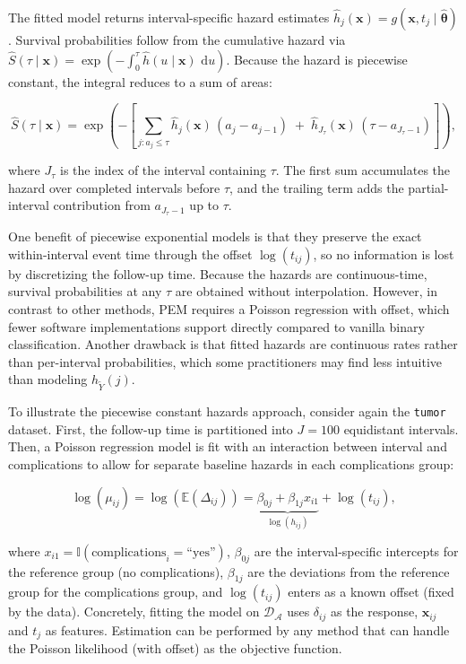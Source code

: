 \documentclass[
  letterpaper,
  krantz2]{style/krantz}
\begin{document}
The fitted model returns interval-specific hazard estimates
\(\hat{h}_j(\mathbf{x}) = g(\mathbf{x}, t_j \mid \hat{\boldsymbol{\theta}})\).
Survival probabilities follow from the cumulative hazard via
\(\hat{S}(\tau \mid \mathbf{x}) = \exp\left(-\int_0^\tau \hat{h}(u \mid \mathbf{x})\,\,\mathrm{d}u\right)\).
Because the hazard is piecewise constant, the integral reduces to a sum
of areas:

\[
\hat{S}(\tau \mid \mathbf{x}) = \exp\!\left(-\left[\sum_{j: a_j \leq \tau} \hat{h}_j(\mathbf{x})\,(a_j - a_{j-1}) \;+\; \hat{h}_{J_\tau}(\mathbf{x})\,(\tau - a_{J_\tau-1})\right]\right),
\]

where \(J_\tau\) is the index of the interval containing \(\tau\). The
first sum accumulates the hazard over completed intervals before
\(\tau\), and the trailing term adds the partial-interval contribution
from \(a_{J_\tau-1}\) up to \(\tau\).

One benefit of piecewise exponential models is that they preserve the
exact within-interval event time through the offset \(\log(t_{ij})\), so
no information is lost by discretizing the follow-up time. Because the
hazards are continuous-time, survival probabilities at any \(\tau\) are
obtained without interpolation. However, in contrast to other methods,
PEM requires a Poisson regression with offset, which fewer software
implementations support directly compared to vanilla binary
classification. Another drawback is that fitted hazards are continuous
rates rather than per-interval probabilities, which some practitioners
may find less intuitive than modeling \(h_{\tilde{Y}}(j)\).

To illustrate the piecewise constant hazards approach, consider again
the \texttt{tumor} dataset. First, the follow-up time is partitioned
into \(J = 100\) equidistant intervals. Then, a Poisson regression model
is fit with an interaction between interval and complications to allow
for separate baseline hazards in each complications group:

\[
\log(\mu_{ij}) = \log(\mathbb{E}(\Delta_{ij})) = \underbrace{\beta_{0j} + \beta_{1j}x_{i1}}_{\log(h_{ij})} + \log(t_{ij}),
\]

where \(x_{i1} = \mathbb{I}(\text{complications}_i = \text{``yes''})\),
\(\beta_{0j}\) are the interval-specific intercepts for the reference
group (no complications), \(\beta_{1j}\) are the deviations from the
reference group for the complications group, and \(\log(t_{ij})\) enters
as a known offset (fixed by the data). Concretely, fitting the model on
\(\mathcal{D}_{\mathcal{A}}\) uses \(\delta_{ij}\) as the response,
\(\mathbf{x}_{ij}\) and \(t_j\) as features. Estimation can be performed
by any method that can handle the Poisson likelihood (with offset) as
the objective function.
\end{document}
